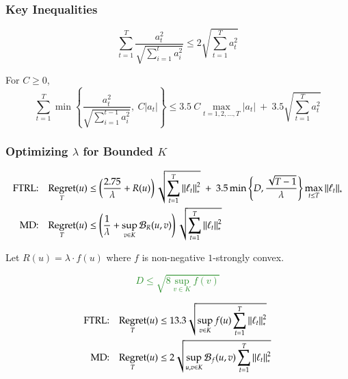 \documentclass[usenames,dvipsnames]{beamer}
\newtheorem*{proposition}{Proposition}
\DeclareMathOperator{\Regret}{Regret}
\newcommand{\norm}[1]{\left\|#1\right\|}
\newcommand{\Breg}{\mathcal{B}}
\begin{document}
\begin{frame}
\frametitle{Key Inequalities}

\begin{lemma}
$$
\sum_{t=1}^T \frac{a_t^2}{\sqrt{\sum_{i=1}^t a_i^2}} \le 2 \sqrt{\sum_{t=1}^T a_t^2}
$$
\end{lemma}

\pause

\begin{lemma}
For $C \ge 0$,
$$
\sum_{t=1}^T \min \left\{ \frac{a_t^2}{\sqrt{\sum_{i=1}^{t-1} a_i^2}}, \ C |a_t| \right\}
\le 3.5 \ C \max_{t=1,2,\dots,T} |a_t| \ + \ 3.5 \sqrt{\sum_{t=1}^T a_t^2}
$$
\end{lemma}


\end{frame}


\begin{frame}
\frametitle{Optimizing $\lambda$ for Bounded $K$}

\fontsize{8.5pt}{10}\selectfont

\begin{align*}
\textsc{FTRL:} & & \Regret_T(u) & \le \left( \frac{2.75}{\lambda} + R(u)\right) \sqrt{\sum_{t=1}^T \norm{\ell_t}_*^2} \ + \ 3.5 \min \left\{ D, \frac{\sqrt{T-1}}{\lambda} \right\} \max_{t \le T} \norm{\ell_t}_* \\
\textsc{MD:} & & \Regret_T(u) & \le \left( \frac{1}{\lambda} + \sup_{v \in K} \Breg_{R}(u,v) \right) \sqrt{\sum_{t=1}^T \norm{\ell_t}_*^2}
\end{align*}

\vspace{0.3cm}

Let $R(u) = \lambda \cdot f(u)$ where $f$ is non-negative $1$-strongly convex.

\pause

\textcolor{ForestGreen}{
$$
D \le \sqrt{8 \sup_{v \in K} f(v)}
$$
}

\pause

\begin{align*}
\textsc{FTRL:} & & \Regret_T(u) & \le 13.3 \sqrt{\sup_{v \in K} f(u) \sum_{t=1}^T \norm{\ell_t}_*^2} \\
\textsc{MD:} & & \Regret_T(u) & \le 2 \sqrt{\sup_{u, v \in K} \Breg_{f}(u,v) \sum_{t=1}^T \norm{\ell_t}_*^2}
\end{align*}
\end{frame}
\end{document}
